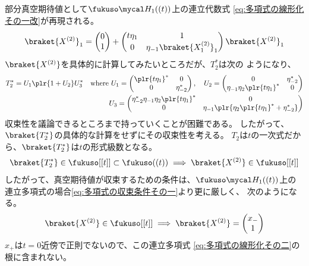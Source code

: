 {	部分真空期待値として$\fukuso\Eta_1((t))$上の連立代数式
	\eqref{eq:多項式の線形化その一改}が再現される。
	\begin{equation*}\begin{split}
		\braket{X^{(2)}}_1 = \pvec{0}{1} + \begin{pmatrix}
			t\eta_1 & 1 \\ 0 & \eta_{-1}\braket{X^{(2)}_1}_1
		\end{pmatrix} \braket{X^{(2)}}_1
	\end{split}\end{equation*}
	$\braket{X^{(2)}}$を具体的に計算してみたいところだが、$T_2^*$は次の
	ようになり、
	\begin{equation*}\begin{split}
		T_2^* = U_1\plr{1 + U_2}U_3^* \quad\text{where }
		U_1 = \begin{pmatrix}
			\plr{t\eta_1}^* & 0 \\ 0 & \eta_{-2}^*
		\end{pmatrix},\quad U_2 = \begin{pmatrix}
			0 & \eta_{-2}^* \\ \eta_{-1}\eta_2\plr{t\eta_1}^* & 0
		\end{pmatrix} \\
		U_3 = \begin{pmatrix}
			\eta_{-2}^*\eta_{-1}\eta_2\plr{t\eta_1}^* & 0 \\
			0 & \eta_{-1}\plr{\eta_2\plr{t\eta_1}^* + \eta_{-2}^*} \\
		\end{pmatrix}
	\end{split}\end{equation*}
	収束性を議論できるところまで持っていくことが困難である。
	したがって、$\braket{T_2^*}$の具体的な計算をせずにその収束性を考える。
	$T_2$は$t$の一次式だから、$\braket{T_2^*}$は$t$の形式級数となる。
	\begin{equation*}\begin{split}
		\braket{T_2^*}\in\fukuso[[t]]\subset\fukuso((t))
		\implies \braket{X^{(2)}}\in\fukuso[[t]]
	\end{split}\end{equation*}
	したがって、真空期待値が収束するための条件は、$\fukuso\Eta_1((t))$上の
	連立多項式の場合\eqref{eq:多項式の収束条件その一}より更に厳しく、
	次のようになる。
	\begin{equation*}\begin{split}
		\braket{X^{(2)}}\in\fukuso[[t]]
		\implies \braket{X^{(2)}} = \pvec{x_-}{1}
	\end{split}\end{equation*}
	$x_+$は$t=0$近傍で正則でないので、この連立多項式
	\eqref{eq:多項式の線形化その二}の根に含まれない。

}
